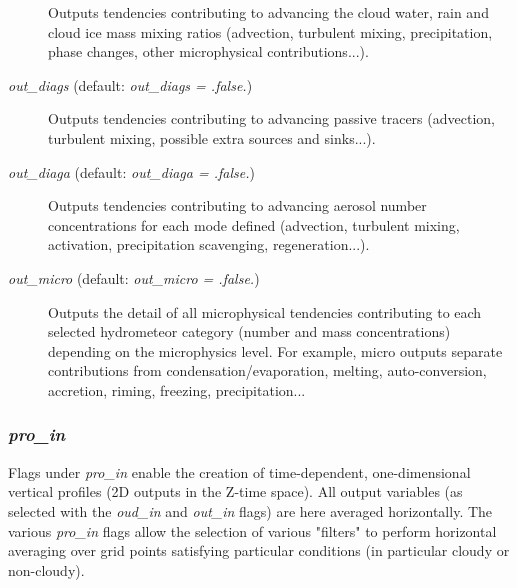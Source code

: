 \documentclass[12pt,A4,french]{article}
\begin{document}
\begin{description}
Outputs tendencies contributing to advancing the cloud water, rain and cloud ice mass mixing ratios (advection, turbulent mixing, precipitation, phase changes, other microphysical contributions...).

\item[{\it out\_diags} (default: {\it out\_diags = .false.})]

Outputs tendencies contributing to advancing passive tracers (advection, turbulent mixing, possible extra sources and sinks...).

\item[{\it out\_diaga} (default: {\it out\_diaga = .false.})]

Outputs tendencies contributing to advancing aerosol number concentrations for each mode defined (advection, turbulent mixing, activation, precipitation scavenging, regeneration...).

\item[{\it out\_micro} (default: {\it out\_micro = .false.})]

Outputs the detail of all microphysical tendencies contributing to each selected hydrometeor category (number and mass concentrations) depending on the microphysics level. For example, micro outputs separate contributions from condensation/evaporation, melting, auto-conversion, accretion, riming, freezing, precipitation...

\end{description}

\subsubsection{{\it pro\_in}}

Flags under {\it pro\_in} enable the creation of time-dependent, one-dimensional vertical profiles (2D outputs in the Z-time space). All output variables (as selected with the {\it oud\_in} and {\it out\_in} flags) are here averaged horizontally. The various {\it pro\_in} flags allow the selection of various "filters" to perform horizontal averaging over grid points satisfying particular conditions (in particular cloudy or non-cloudy).
\end{document}
